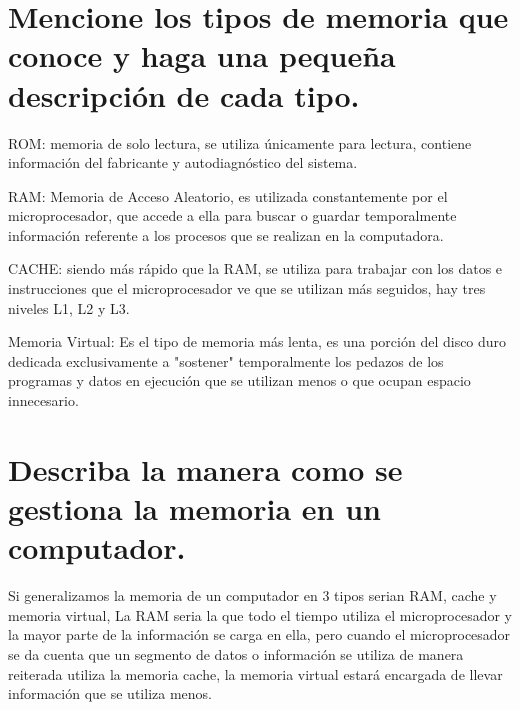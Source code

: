 \documentclass{article}
\begin{document}
\section{Mencione los tipos de memoria que conoce y haga una pequeña descripción de cada tipo.}

ROM: memoria de solo lectura, se utiliza únicamente para lectura, contiene información del fabricante y autodiagnóstico del sistema. \cite{wiki}
 
RAM: Memoria de Acceso Aleatorio, es utilizada constantemente por el microprocesador, que accede a ella para buscar o guardar temporalmente información referente a los procesos que se realizan en la computadora. \cite{Venturini}

CACHE: siendo más rápido que la RAM, se utiliza para trabajar con los datos e instrucciones que el microprocesador ve que se utilizan más seguidos, hay tres niveles L1, L2 y L3.

Memoria Virtual: Es el tipo de memoria más lenta, es una porción del disco duro dedicada exclusivamente a "sostener"  temporalmente los pedazos de los programas y datos en ejecución que se utilizan menos o que ocupan espacio innecesario.

\section{Describa la manera como se gestiona la memoria en un computador.}

Si generalizamos la memoria de un computador en 3 tipos serian RAM, cache y memoria virtual, La RAM seria la que todo el tiempo utiliza el microprocesador y la mayor parte de la información se carga en ella, pero cuando el microprocesador se da cuenta que un segmento de datos o información se utiliza de manera reiterada utiliza la memoria cache, la memoria virtual estará encargada de llevar información que se utiliza menos.
\end{document}
